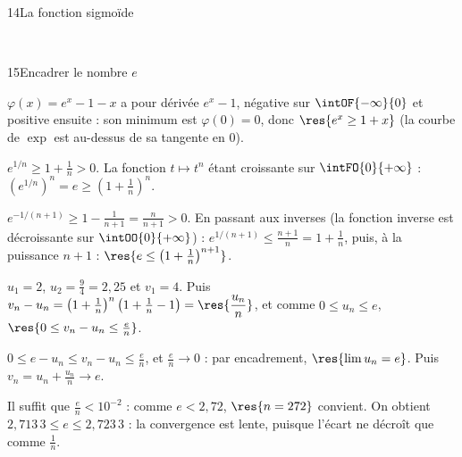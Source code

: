 \begin{corrige}{14}{La fonction sigmoïde}
\begin{minipage}[t]{0.44\linewidth}
\\[0.5mm]
\end{minipage}
\end{corrige}

\begin{corrige}{15}{Encadrer le nombre $e$}
\begin{questions}
  \item $\varphi(x)=e^{x}-1-x$ a pour dérivée $e^{x}-1$, négative sur $\intOF{-\infty}{0}$ et positive ensuite : son minimum est
    $\varphi(0)=0$, donc $\res{e^{x}\geq1+x}$ (la courbe de $\exp$ est au-dessus de sa tangente en $0$).
  \item $e^{1/n}\geq1+\frac1n>0$. La fonction $t\mapsto t^{n}$ étant croissante sur $\intFO{0}{+\infty}$ : $\left(e^{1/n}\right)^{n}=e\geq\left(1+\frac1n\right)^{n}$.
  \item $e^{-1/(n+1)}\geq1-\frac{1}{n+1}=\frac{n}{n+1}>0$. En passant aux inverses (la fonction inverse est décroissante sur
    $\intOO{0}{+\infty}$) : $e^{1/(n+1)}\leq\frac{n+1}{n}=1+\frac1n$, puis, à la puissance $n+1$ : $\res{e\leq\left(1+\frac1n\right)^{n+1}}$.
\end{questions}
\begin{questions}[resume]
  \item $u_1=2$, $u_2=\frac94=2{,}25$ et $v_1=4$. Puis $v_n-u_n=\left(1+\frac1n\right)^{n}\left(1+\frac1n-1\right)=\res{\dfrac{u_n}{n}}$, et comme
    $0\leq u_n\leq e$, $\res{0\leq v_n-u_n\leq\frac en}$.
  \item $0\leq e-u_n\leq v_n-u_n\leq\frac en$, et $\frac en\to0$ : par encadrement, $\res{\lim u_n=e}$. Puis $v_n=u_n+\frac{u_n}{n}\to e$.
  \item Il suffit que $\frac en<10^{-2}$ : comme $e<2{,}72$, $\res{n=272}$ convient. On obtient $2{,}713\,3\leq e\leq2{,}723\,3$ : la
    convergence est lente, puisque l'écart ne décroît que comme $\frac1n$.
\end{questions}
\end{corrige}

